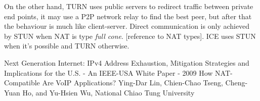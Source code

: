 \documentclass[11pt,twocolumn]{article}
\begin{document}
On the other hand, TURN uses public servers to redirect traffic between private end points, it may use a P2P network relay to find the best peer, but after that the behaviour is much like client-server. Direct communication is only achieved by STUN when NAT is type \textit{full cone}. {\color{red} [reference to NAT types]}. ICE uses STUN when it's possible and TURN otherwise.

\begin{thebibliography}{9}


 Next Generation Internet: IPv4 Address Exhaustion, Mitigation Strategies and Implications for the U.S. - An IEEE-USA White Paper - 2009
 How NAT-Compatible Are VoIP Applications? Ying-Dar Lin, Chien-Chao Tseng, Cheng-Yuan Ho, and Yu-Hsien Wu, National Chiao Tung University


\end{thebibliography}
\end{document}

